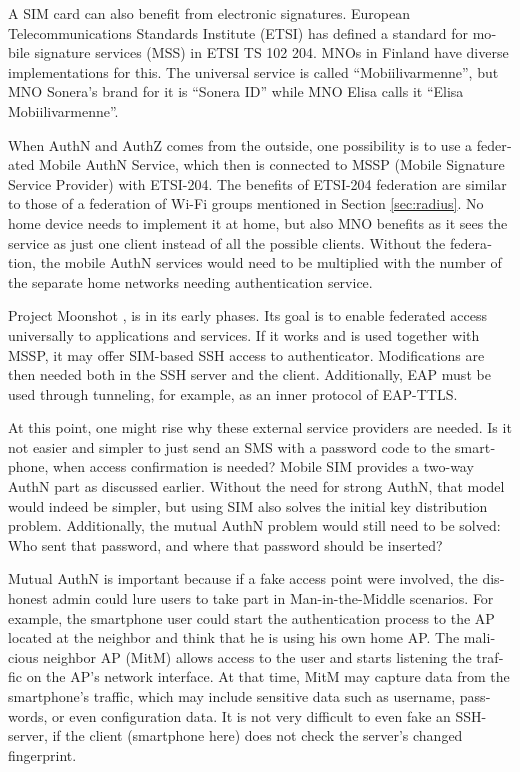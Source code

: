 \documentclass[12pt,a4paper,english]{tutthesis}
\begin{document}
\begin{otherlanguage}{english}
A SIM card can also benefit from electronic signatures.
European Telecommunications Standards Institute (ETSI) has defined a
standard for mobile signature services (MSS) in ETSI TS 102 204.
MNOs in Finland have diverse implementations for this. The universal 
service is called ``Mobiilivarmenne'', but MNO Sonera's brand for it
is ``Sonera ID'' while MNO Elisa calls it ``Elisa Mobiilivarmenne''.

When AuthN and AuthZ comes from the outside, one possibility is to use a
federated Mobile AuthN Service, which then is connected to  MSSP (Mobile
Signature Service Provider) with ETSI-204. The benefits of ETSI-204
federation are similar to those of a federation of Wi-Fi groups
mentioned in Section \ref{sec:radius}. No home device needs to implement it
at home, but also MNO benefits as it sees the service as just one
client instead of all the possible clients.  Without the federation, the mobile AuthN services would need to be
multiplied with the number of the separate home networks needing authentication service.



Project Moonshot \cite{moonshot}, is in its early phases. Its goal is
to enable federated access universally to applications and
services. If it works and is used together with MSSP, it may offer
SIM-based SSH access to authenticator. Modifications are then needed 
both in the SSH server and the client. Additionally, EAP must be used through
tunneling, for example, as an inner protocol of EAP-TTLS.

At this point, one might rise why these external service
providers are needed. Is it not easier and simpler to just send 
an SMS with a password code to the smartphone, when access confirmation is needed?
Mobile SIM provides a two-way AuthN part as discussed earlier.
Without the need for strong AuthN, that model would indeed be 
simpler, but using SIM also solves the initial key distribution problem.
Additionally, the mutual AuthN problem would still need to be solved:
Who sent that password, and where that password should be inserted?

Mutual AuthN is important because if a fake access point were involved, the 
dishonest admin could lure users to take part in Man-in-the-Middle scenarios.
For example, the smartphone user could start the authentication process
to the AP located at the neighbor and think that he is using
his own home AP. 
The malicious neighbor AP (MitM) allows access to the user and starts 
listening the traffic on the AP's network interface. At that time, 
MitM may capture data from the  smartphone's  traffic, which may  include
sensitive  data such as username, passwords, or even configuration data.
It is not very difficult to even fake an SSH-server, if the 
client (smartphone here) does not check the server's changed
fingerprint.





\end{otherlanguage}
\end{document}
